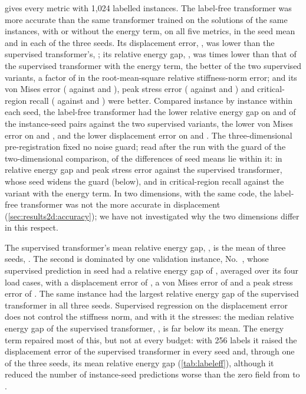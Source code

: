  gives every metric with 1,024 labelled instances. The label-free transformer
was more accurate than the same transformer trained on the solutions of the same instances,
with or without the energy term, on all five metrics, in the seed mean and in each of the
three seeds. Its displacement error, \numThreeFreeDisp{}, was \numThreeFreeDispAdvantage{}
lower than the supervised transformer's, \numThreeLabDisp{}; its relative energy gap,
\numThreeFreeGap{}, was \numThreeAncOverFreeGap{} times lower than that of the supervised
transformer with the energy term, the better of the two supervised variants, a factor of
\numThreeAncOverFreeGapRoot{} in the root-mean-square relative stiffness-norm error; and its
von Mises error (\numThreeFreeVm{} against \numThreeLabVm{} and \numThreeAncVm{}), peak
stress error (\numThreeFreePeak{} against \numThreeLabPeak{} and \numThreeAncPeak{}) and
critical-region recall (\numThreeFreeRecall{} against \numThreeLabRecall{} and
\numThreeAncRecall{}) were better. Compared instance by instance within each seed, the
label-free transformer had the lower relative energy gap on \numPairThreeLabGap{} and
\numPairThreeAncGap{} of the \numThreePairs{} instance-seed pairs against the two supervised
variants, the lower von Mises error on \numPairThreeLabVm{} and \numPairThreeAncVm{}, and
the lower displacement error on \numPairThreeLabDisp{} and \numPairThreeAncDisp{}. The
three-dimensional pre-registration fixed no noise guard; read after the run with the guard
of the two-dimensional comparison, \numThreeGuardWithin{} of the \numThreeGuardTotal{}
differences of seed means lie within it: in relative energy gap and peak stress error
against the supervised transformer, whose seed \numThreeLabWorstSeed{} widens the guard
(below), and in critical-region recall against the variant with the energy term. In two
dimensions, with the same code, the label-free transformer was not the more accurate in
displacement
(\cref{sec:results2d:accuracy}); we have not investigated why the two dimensions differ in
this respect.

The supervised transformer's mean relative energy gap, \numThreeLabGapMs{}, is the mean of
three seeds, \numThreeLabGapSeeds{}. The second is dominated by one validation instance,
No.~\numWorstIndex{}, whose supervised prediction in seed \numThreeLabWorstSeed{} had a
relative energy gap of \numThreeLabWorst{}, averaged over its four load cases, with a
displacement error of \numWorstSeedLabDisp{}, a von Mises error of \numWorstSeedLabVm{} and
a peak stress error of \numWorstSeedLabPeak{}. The same instance had the largest relative
energy gap of the supervised transformer in all three seeds. Supervised regression on the
displacement error does not control the stiffness norm, and with it the stresses: the
median relative energy gap of the supervised transformer, \numThreeLabGapMedian{}, is far
below its mean. The energy term repaired most of this, but not at every budget: with 256
labels it raised the displacement error of the supervised transformer in every seed and,
through one of the three seeds, its mean relative energy gap (\cref{tab:labeleff}),
although it reduced the number of instance-seed predictions worse than the zero field from
\numThreeLabWorseTwoFiveSix{} to \numThreeAncWorseTwoFiveSix{}.


